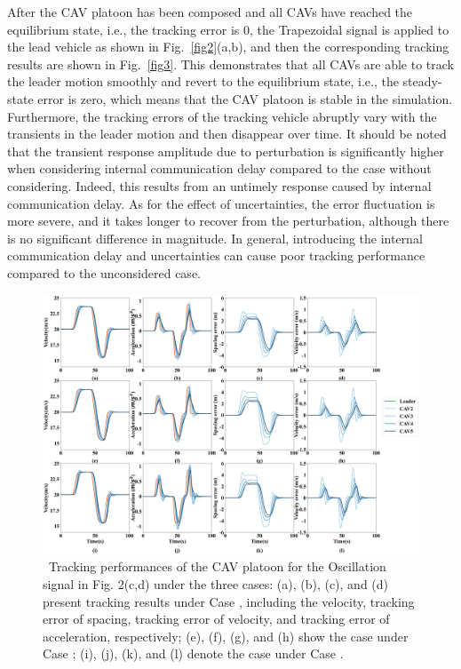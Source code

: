 \documentclass[journal]{IEEEtran}
\begin{document}
After the CAV platoon has been composed and all CAVs have reached the equilibrium state, i.e., the tracking error is 0, the Trapezoidal signal is applied to the lead vehicle as shown in Fig.~\ref{fig2}(a,b), and then the corresponding tracking results are shown in Fig.~\ref{fig3}. This demonstrates that all CAVs are able to track the leader motion smoothly and revert to the equilibrium state, i.e., the steady-state error is zero, which means that the CAV platoon is stable in the simulation. Furthermore, the tracking errors of the tracking vehicle abruptly vary with the transients in the leader motion and then disappear over time. It should be noted that the transient response amplitude due to perturbation is significantly higher when considering internal communication delay compared to the case without considering. Indeed, this results from an untimely response caused by internal communication delay. As for the effect of uncertainties, the error fluctuation is more severe, and it takes longer to recover from the perturbation, although there is no significant difference in magnitude. In general, introducing the internal communication delay and uncertainties can cause poor tracking performance compared to the unconsidered case.

\begin{figure}
  \centering
  \includegraphics[width=16cm]{figs/fig4.png}
  \caption{~Tracking performances of the CAV platoon for the Oscillation signal in Fig. 2(c,d) under the three cases: (a), (b), (c), and (d) present tracking results under Case \uppercase\expandafter{}, including the velocity, tracking error of spacing, tracking error of velocity, and tracking error of acceleration, respectively; (e), (f), (g), and (h) show the case under Case  \uppercase\expandafter{}; (i), (j), (k), and (l) denote the case under Case \uppercase\expandafter{}.}
  \label{fig4}
\end{figure}
\end{document}
